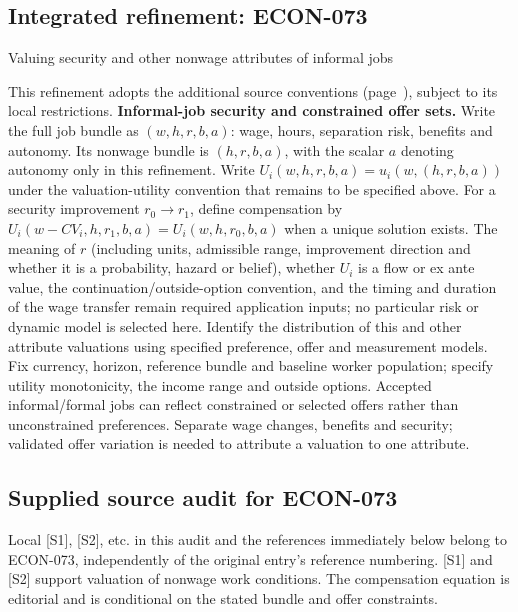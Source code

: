 \documentclass[11pt,a4paper]{article}
\begin{document}
\subsection*{Integrated refinement: ECON-073}
{\sffamily\small\color{muted}Valuing security and other nonwage attributes of informal jobs\par}
This refinement adopts the additional source conventions
(page~\pageref{audited:conventions}), subject to its local restrictions.
\textbf{Informal-job security and constrained offer sets.}
Write the full job bundle as $(w,h,r,b,a)$: wage, hours, separation risk, benefits and
autonomy. Its nonwage bundle is $(h,r,b,a)$, with the scalar $a$ denoting autonomy only in this refinement. Write $U_i(w,h,r,b,a)=u_i(w,(h,r,b,a))$ under the valuation-utility convention that remains to be specified above. For a security improvement $r_0\to r_1$, define compensation by
$U_i(w-CV_i,h,r_1,b,a)=U_i(w,h,r_0,b,a)$ when a unique solution exists.
The meaning of $r$ (including units, admissible range, improvement direction and whether it is a probability, hazard or belief), whether $U_i$ is a flow or ex ante value, the continuation/outside-option convention, and the timing and duration of the wage transfer remain required application inputs; no particular risk or dynamic model is selected here.
Identify the distribution of this and other attribute valuations using
specified preference, offer and measurement models. Fix currency, horizon,
reference bundle and baseline worker population; specify utility monotonicity,
the income range and outside options. Accepted informal/formal jobs can reflect
constrained or selected offers rather than unconstrained preferences. Separate
wage changes, benefits and security; validated offer variation is needed to
attribute a valuation to one attribute.
\subsection*{Supplied source audit for ECON-073}
Local [S1], [S2], etc. in this audit and the references immediately below
belong to ECON-073, independently of the original entry's reference numbering.
[S1] and [S2] support valuation of nonwage work conditions. The compensation equation is editorial and is conditional on the stated bundle and offer constraints.
\end{document}
